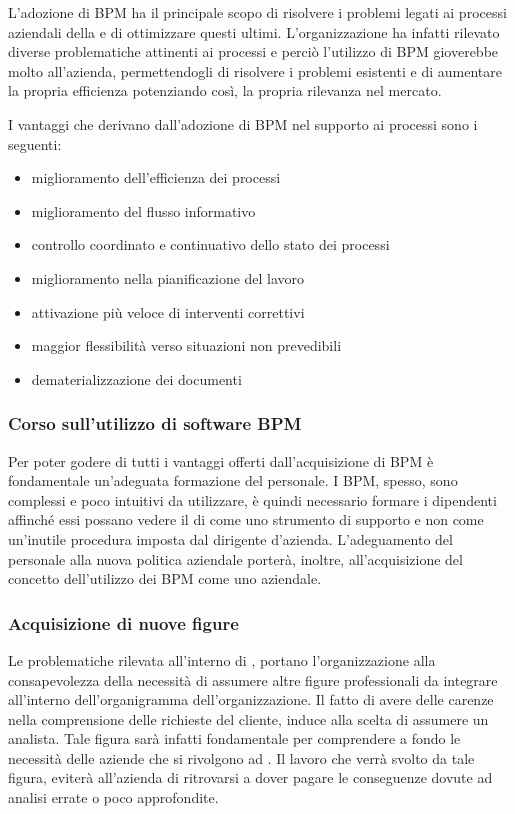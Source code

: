     L'adozione di  BPM ha il principale scopo di risolvere i problemi legati ai processi aziendali della \customer e di ottimizzare questi ultimi. L'organizzazione ha infatti rilevato diverse problematiche attinenti ai processi e perciò l'utilizzo di \sw BPM gioverebbe molto all'azienda, permettendogli di risolvere i problemi esistenti e di aumentare la propria efficienza potenziando così, la propria rilevanza nel mercato.



I vantaggi che derivano dall'adozione di \sw BPM nel supporto ai processi sono i seguenti:

\begin{itemize}
	\item miglioramento dell'efficienza dei processi
	\item miglioramento del flusso informativo
	\item controllo coordinato e continuativo dello stato dei processi
	\item miglioramento nella pianificazione del lavoro
	\item attivazione più veloce di interventi correttivi
	\item maggior flessibilità verso situazioni non prevedibili
	\item dematerializzazione dei documenti 	
\end{itemize}


\subsubsection{Corso sull'utilizzo di software BPM}
Per poter godere di tutti i vantaggi offerti dall'acquisizione di \sw BPM è fondamentale un'adeguata formazione del personale. I \sw BPM, spesso, sono complessi e poco intuitivi da utilizzare, è quindi necessario formare i dipendenti affinché essi possano 
vedere il \sw di  come uno strumento di supporto e non come un'inutile procedura imposta dal dirigente d'azienda.
L'adeguamento del personale alla nuova politica aziendale porterà, inoltre, all'acquisizione del concetto dell'utilizzo dei \sw BPM come uno  aziendale.

\subsubsection{Acquisizione di nuove figure}
Le problematiche rilevata all'interno di \customer , portano l'organizzazione alla consapevolezza della necessità di assumere altre figure professionali da integrare all'interno dell'organigramma dell'organizzazione.
Il fatto di avere delle carenze nella comprensione delle richieste del cliente, induce \customer alla scelta di assumere un analista. Tale figura sarà infatti fondamentale per comprendere a fondo le necessità delle aziende che si rivolgono ad \customer. Il lavoro che verrà svolto da tale figura, eviterà all'azienda di ritrovarsi a dover pagare le conseguenze dovute ad analisi errate o poco approfondite.

